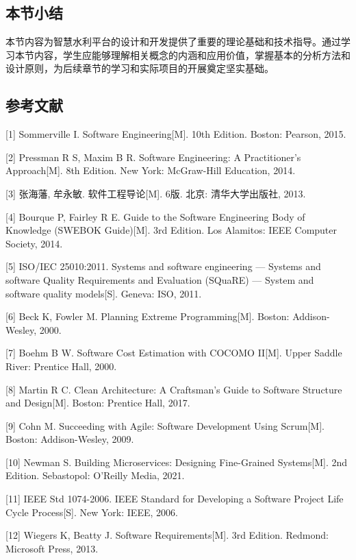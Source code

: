 \subsection{本节小结}\label{ux672cux8282ux5c0fux7ed3-1}

本节内容为智慧水利平台的设计和开发提供了重要的理论基础和技术指导。通过学习本节内容，学生应能够理解相关概念的内涵和应用价值，掌握基本的分析方法和设计原则，为后续章节的学习和实际项目的开展奠定坚实基础。

\subsection{参考文献}\label{ux53c2ux8003ux6587ux732e-1}

{[}1{]} Sommerville I. Software Engineering{[}M{]}. 10th Edition. Boston: Pearson, 2015.

{[}2{]} Pressman R S, Maxim B R. Software Engineering: A Practitioner's Approach{[}M{]}. 8th Edition. New York: McGraw-Hill Education, 2014.

{[}3{]} 张海藩, 牟永敏. 软件工程导论{[}M{]}. 6版. 北京: 清华大学出版社, 2013.

{[}4{]} Bourque P, Fairley R E. Guide to the Software Engineering Body of Knowledge (SWEBOK Guide){[}M{]}. 3rd Edition. Los Alamitos: IEEE Computer Society, 2014.

{[}5{]} ISO/IEC 25010:2011. Systems and software engineering --- Systems and software Quality Requirements and Evaluation (SQuaRE) --- System and software quality models{[}S{]}. Geneva: ISO, 2011.

{[}6{]} Beck K, Fowler M. Planning Extreme Programming{[}M{]}. Boston: Addison-Wesley, 2000.

{[}7{]} Boehm B W. Software Cost Estimation with COCOMO II{[}M{]}. Upper Saddle River: Prentice Hall, 2000.

{[}8{]} Martin R C. Clean Architecture: A Craftsman's Guide to Software Structure and Design{[}M{]}. Boston: Prentice Hall, 2017.

{[}9{]} Cohn M. Succeeding with Agile: Software Development Using Scrum{[}M{]}. Boston: Addison-Wesley, 2009.

{[}10{]} Newman S. Building Microservices: Designing Fine-Grained Systems{[}M{]}. 2nd Edition. Sebastopol: O'Reilly Media, 2021.

{[}11{]} IEEE Std 1074-2006. IEEE Standard for Developing a Software Project Life Cycle Process{[}S{]}. New York: IEEE, 2006.

{[}12{]} Wiegers K, Beatty J. Software Requirements{[}M{]}. 3rd Edition. Redmond: Microsoft Press, 2013.


